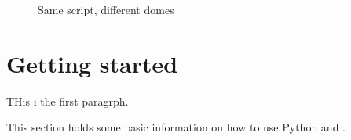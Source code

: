 {\begin{figure}[tbp,h]
\begin{latexonly}
  \end{latexonly}
  \begin{htmlonly}
  \end{htmlonly}
  \caption{Same script, different domes} \label{scallops}
\end{figure}



\section{Getting started}
\label{sec:getting-started}


THis i the first paragrph.

This section holds some basic information on how to use Python and \pyformex. 

}
